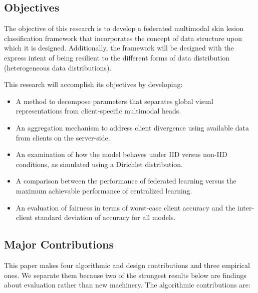 \documentclass{ieeeaccess}
\begin{document}
\subsection{Objectives}

The objective of this research is to develop a federated multimodal skin lesion classification framework that incorporates the concept of data structure upon which it is designed. Additionally, the framework will be designed with the express intent of being resilient to the different forms of data distribution (heterogeneous data distributions).

This research will accomplish its objectives by developing:


\begin{itemize}
    \item A method to decompose parameters that separates global visual representations from client-specific multimodal heads.
    \item An aggregation mechanism to address client divergence using available data from clients on the server-side.
    \item An examination of how the model behaves under IID versus non-IID conditions, as simulated using a Dirichlet distribution.
    \item A comparison between the performance of federated learning versus the maximum achievable performance of centralized learning.
    \item An evaluation of fairness in terms of worst-case client accuracy and the inter-client standard deviation of accuracy for all models.
\end{itemize}

\subsection{Major Contributions}

This paper makes four algorithmic and design contributions and three empirical ones. We separate them because two of the strongest results below are findings about evaluation rather than new machinery. The algorithmic contributions are:
\end{document}
